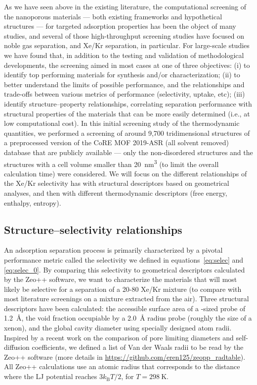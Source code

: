 \documentclass[main.tex]{subfiles}
\begin{document}
As we have seen above in the existing literature, the computational screening of the nanoporous materials --- both existing frameworks and hypothetical structures --- for targeted adsorption properties has been the object of many studies, and several of those high-throughput screening studies have focused on noble gas separation, and Xe/Kr separation, in particular. For large-scale studies we have found that, in addition to the testing and validation of methodological developments, the screening aimed in most cases at one of three objectives: (i) to identify top performing materials for synthesis and/or characterization; (ii) to better understand the limits of possible performance, and the relationships and trade-offs between various metrics of performance (selectivity, uptake, etc); (iii) identify structure--property relationships, correlating separation performance with structural properties of the materials that can be more easily determined (i.e., at low computational cost). In this initial screening study of the thermodynamic quantities, we performed a screening of around 9,700 tridimensional structures of a preprocessed version of the CoRE MOF 2019-ASR (all solvent removed) database that are publicly available --- only the non-disordered structures and the structures with a cell volume smaller than \SI{20}{\nano\meter\cubed} (to limit the overall calculation time) were considered. We will focus on the different relationships of the Xe/Kr selectivity has with structural descriptors based on geometrical analyses, and then with different thermodynamic descriptors (free energy, enthalpy, entropy). 

\subsection{Structure--selectivity relationships}

An adsorption separation process is primarily characterized by a pivotal performance metric called the selectivity we defined in equations~\ref{eq:selec} and \ref{eq:selec_0}. By comparing this selectivity to geometrical descriptors calculated by the Zeo++ software,\cite{Zeo++} we want to characterize the materials that will most likely be selective for a separation of a 20-80 Xe/Kr mixture (to compare with most literature screenings on a mixture extracted from the air). Three structural descriptors have been calculated: the accessible surface area of a -sized probe of \SI{1.2}{\angstrom}, the void fraction occupiable by a \SI{2.0}{\angstrom} radius probe (roughly the size of a xenon),\cite{vol_Ongari2017} and the global cavity diameter using specially designed atom radii. Inspired by a recent work on the comparison of pore limiting diameters and self-diffusion coefficients,\cite{Hung_2021} we defined a list of Van der Waals radii to be read by the Zeo++ software (more details in \url{https://github.com/eren125/zeopp_radtable}). All Zeo++ calculations use an atomic radius that corresponds to the distance where the LJ potential reaches $3 k_\text{B} T/2$, for $T = \SI{298}{\kelvin}$.
\end{document}
